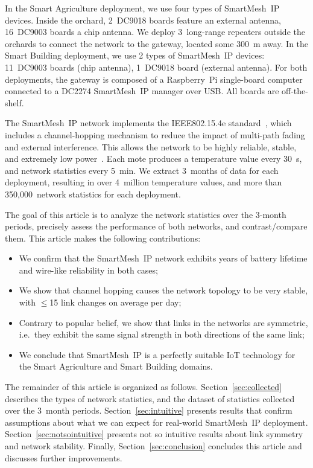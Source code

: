 \documentclass{elsarticle}
\newcommand{\smip}                {SmartMesh~IP\xspace}
\newcommand{\building}            {Smart Building\xspace}
\newcommand{\agri}                {Smart Agriculture\xspace}
\begin{document}

In the \agri deployment, we use four types of \smip devices.
Inside the orchard, 2~DC9018 boards feature an external antenna, 16~DC9003 boards a chip antenna.
We deploy 3~long-range repeaters outside the orchards to connect the network to the gateway, located some 300~m away.
In the \building deployment, we use 2 types of \smip devices: 11~DC9003 boards (chip antenna), 1~DC9018 board (external antenna).
For both deployments, the gateway is composed of a Raspberry~Pi single-board computer connected to a DC2274 \smip manager over USB.
All boards are off-the-shelf.


The \smip network implements the IEEE802.15.4e standard~\cite{std_ieee802154e_2012}, which includes a channel-hopping mechanism to reduce the impact of multi-path fading and external interference.
This allows the network to be highly reliable, stable, and extremely low power~\cite{watteyne10mitigating,watteyne09reliability}.
Each mote produces a temperature value every 30~s, and network statistics every 5~min.
We extract 3~months of data for each deployment, resulting in over 4~million temperature values, and more than 350,000~network statistics for each deployment.


The goal of this article is to analyze the network statistics over the 3-month periods, precisely assess the performance of both networks, and contrast/compare them.
This article makes the following contributions:
\begin{itemize}
    \item We confirm that the \smip network exhibits years of battery lifetime and wire-like reliability in both cases;
    \item We show that channel hopping causes the network topology to be very stable, with $\leq$15 link changes on average per day;
    \item Contrary to popular belief, we show that links in the networks are symmetric, i.e.~they exhibit the same signal strength in both directions of the same link;
    \item We conclude that \smip is a perfectly suitable IoT technology for the \agri and \building domains.
\end{itemize}


The remainder of this article is organized as follows.
Section~\ref{sec:collected} describes the types of network statistics, and the dataset of statistics collected over the 3~month periods.
Section~\ref{sec:intuitive} presents results that confirm assumptions about what we can expect for real-world \smip deployment.
Section~\ref{sec:notsointuitive} presents not so intuitive results about link symmetry and network stability.
Finally, Section~\ref{sec:conclusion} concludes this article and discusses further improvements.
\end{document}
